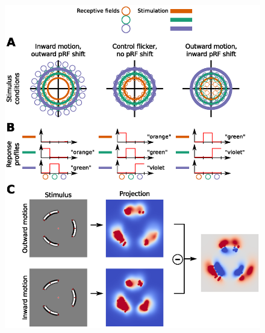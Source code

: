 \begin{figure}[htb!]
\captionsetup{labelformat=empty}
\centering
\includegraphics[width=\textwidth]{figures/chapter_04/fig4.eps}
\caption{}
\end{figure}

